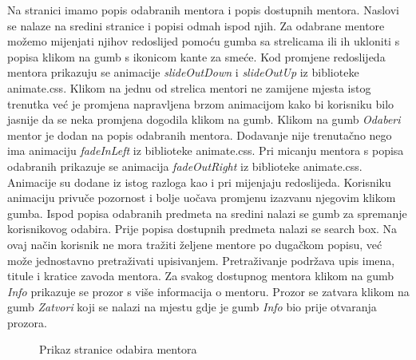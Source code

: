 \documentclass[times, utf8, zavrsni, numeric]{fer}
\begin{document}
    Na stranici imamo popis odabranih mentora i popis dostupnih mentora. Naslovi se nalaze na sredini stranice i popisi odmah ispod njih. Za odabrane mentore možemo mijenjati njihov redoslijed pomoću gumba sa strelicama ili ih ukloniti s popisa klikom na gumb s ikonicom kante za smeće. Kod promjene redoslijeda mentora prikazuju se animacije \textit{slideOutDown} i \textit{slideOutUp} iz biblioteke animate.css. Klikom na jednu od strelica mentori ne zamijene mjesta istog trenutka već je promjena napravljena brzom animacijom kako bi korisniku bilo jasnije da se neka promjena dogodila klikom na gumb. Klikom na gumb \textit{Odaberi} mentor je dodan na popis odabranih mentora. Dodavanje nije trenutačno nego ima animaciju \textit{fadeInLeft} iz biblioteke animate.css. Pri micanju mentora s popisa odabranih prikazuje se animacija \textit{fadeOutRight} iz biblioteke animate.css. Animacije su dodane iz istog razloga kao i pri mijenjaju redoslijeda. Korisniku animaciju privuče pozornost i bolje uočava promjenu izazvanu njegovim klikom gumba. Ispod popisa odabranih predmeta na sredini nalazi se gumb za spremanje korisnikovog odabira. Prije popisa dostupnih predmeta nalazi se search box. Na ovaj način korisnik ne mora tražiti željene mentore po dugačkom popisu, već može jednostavno pretraživati upisivanjem. Pretraživanje podržava upis imena, titule i kratice zavoda mentora. Za svakog dostupnog mentora klikom na gumb \textit{Info} prikazuje se prozor s više informacija o mentoru. Prozor se zatvara klikom na gumb \textit{Zatvori} koji se nalazi na mjestu gdje je gumb \textit{Info} bio prije otvaranja prozora.
    
    \begin{figure} [H]
      \centering
      \caption{Prikaz stranice odabira mentora}
    \end{figure}
    
\end{document}
